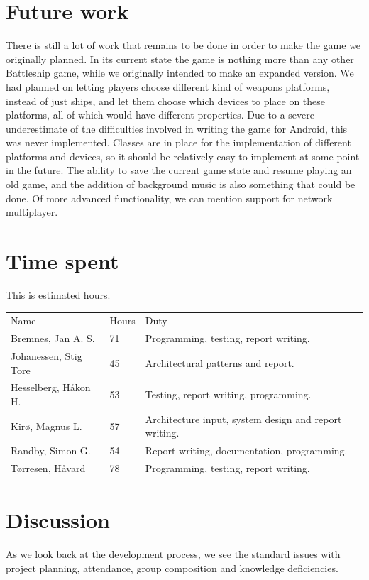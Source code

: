 \documentclass[12pt, a4paper]{article}
\begin{document}
\section{Future work}
	There is still a lot of work that remains to be done in order to make the game we originally planned. In its current state the game is nothing more than any other Battleship game, while we originally intended to make an expanded version. We had planned on letting players choose different kind of weapons platforms, instead of just ships, and let them choose which devices to place on these platforms, all of which would have different properties. Due to a severe underestimate of the difficulties involved in writing the game for Android, this was never implemented. Classes are in place for the implementation of different platforms and devices, so it should be relatively easy to implement at some point in the future. The ability to save the current game state and resume playing an old game, and the addition of background music is also something that could be done. Of more advanced functionality, we can mention support for network multiplayer.


\section{Time spent}
This is estimated hours. 
\begin{tabular}{  p{} p{} p{} }
    Name & Hours &  Duty \\
    Bremnes, Jan A. S. & 71 & Programming, testing, report writing.\\
    Johanessen, Stig Tore & 45 & Architectural patterns and report.\\
    Hesselberg, Håkon H. & 53 & Testing, report writing, programming.\\
    Kirø, Magnus L. & 57 & Architecture input, system design and report writing.\\
    Randby, Simon G. & 54 & Report writing, documentation, programming.\\
    Tørresen, Håvard & 78 & Programming, testing, report writing.\\
\end{tabular}

\section{Discussion}
As we look back at the development process, we see the standard issues with
project planning, attendance, group composition and knowledge deficiencies. 
\end{document}
